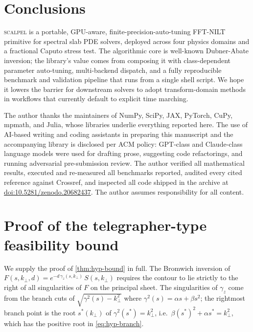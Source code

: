 \documentclass[manuscript,review]{acmart}
\newcommand{\kperp}{k_\perp}
\newcommand{\gammaz}{\gamma_z}
\newcommand{\scalpel}{\textsc{scalpel}}
\begin{document}
\section{Conclusions}\label{sec:conclusions}

\scalpel{} is a portable, GPU-aware, finite-precision-auto-tuning
FFT-NILT primitive for spectral slab PDE solvers, deployed across
four physics domains and a fractional Caputo stress test. The
algorithmic core is well-known Dubner-Abate inversion; the
library's value comes from composing it with class-dependent
parameter auto-tuning, multi-backend dispatch, and a fully
reproducible benchmark and validation pipeline that runs from a
single shell script. We hope it lowers the barrier for downstream
solvers to adopt transform-domain methods in workflows that
currently default to explicit time marching.

\begin{acks}
The author thanks the maintainers of NumPy, SciPy, JAX, PyTorch,
CuPy, mpmath, and Julia, whose libraries underlie everything
reported here. The use of AI-based writing and coding assistants in
preparing this manuscript and the accompanying library is disclosed
per ACM policy: GPT-class and Claude-class language models were used
for drafting prose, suggesting code refactorings, and running
adversarial pre-submission review. The author verified all
mathematical results, executed and re-measured all benchmarks
reported, audited every cited reference against Crossref, and
inspected all code shipped in the archive at
\href{https://doi.org/10.5281/zenodo.20682437}{doi:10.5281/zenodo.20682437}.
The author assumes responsibility for all content.
\end{acks}

\appendix

\section{Proof of the telegrapher-type feasibility bound}\label{sec:proof-hyp}

We supply the proof of \cref{thm:hyp-bound} in full. The Bromwich
inversion of $F(s, \kperp, d) = e^{-d\,\gammaz(s, \kperp)}\,S(s,
\kperp)$ requires the contour to lie strictly to the right of all
singularities of $F$ on the principal sheet. The singularities of
$\gammaz$ come from the branch cuts of $\sqrt{\gamma^2(s) -
\kperp^2}$ where $\gamma^2(s) = \alpha s + \beta s^2$; the rightmost
branch point is the root $s^*(\kperp)$ of $\gamma^2(s^*) = \kperp^2$,
i.e.\ $\beta(s^*)^2 + \alpha s^* = \kperp^2$, which has the positive
root in \cref{eq:hyp-branch}.
\end{document}
